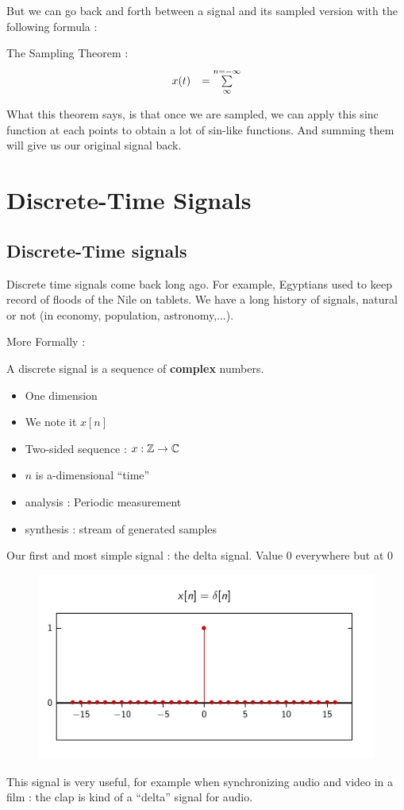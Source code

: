 \documentclass[11pt,a4paper]{article}
\numberwithin{equation}{section}
\begin{document}
But we can go back and forth between a signal and its sampled version with the following formula :
\begin{boite}
    The Sampling Theorem :
    \begin{equation}
        \begin{array}{ll}
            x(t) &= \sum\limits_{\infty}^{n=-\infty}
        \end{array}
    \end{equation}
\end{boite}
What this theorem says, is that once we are sampled, we can apply this sinc function at each points to obtain a lot of sin-like functions. And summing them will give us our original signal back.

\section{Discrete-Time Signals}
\subsection{Discrete-Time signals}
Discrete time signals come back long ago. For example, Egyptians used to keep record of floods of the Nile on tablets. We have a long history of signals, natural or not (in economy, population, astronomy,...). 

More Formally : 
\begin{boite}
    A discrete signal is a sequence of \textbf{complex} numbers.
    \begin{itemize}
        \item One dimension
        \item We note it $x[n]$
        \item Two-sided sequence : $x : \mathbb{Z} \to \mathbb{C}$
        \item $n$ is a-dimensional ``time''
        \item analysis : Periodic measurement
        \item synthesis : stream of generated samples
    \end{itemize}
\end{boite}
Our first and most simple signal : the delta signal. Value 0 everywhere but at 0
\begin{figure}
    \includegraphics[scale=0.6]{images/delta}
\end{figure}
This signal is very useful, for example when synchronizing audio and video in a film : the clap is kind of a ``delta'' signal for audio.
\end{document}
